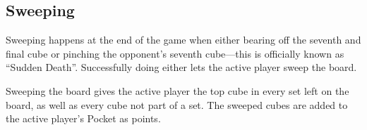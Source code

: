 \subsection{Sweeping}
Sweeping happens at the end of the game when either bearing off the seventh and final cube or pinching the opponent's seventh cube---this is officially known as ``Sudden Death''.
Successfully doing either lets the active player sweep the board.

Sweeping the board gives the active player the top cube in every set left on the board, as well as every cube not part of a set.
The sweeped cubes are added to the active player's Pocket as points.
